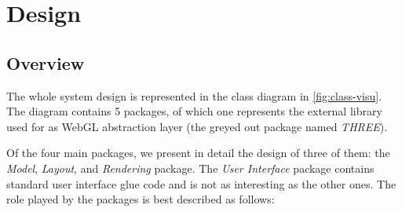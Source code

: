 \section{Design}


\subsection{Overview}

The whole system design is represented in the class diagram in \vref{fig:class-visu}. The diagram contains 5 packages, of which one represents the external library used for as WebGL abstraction layer (the greyed out package named \emph{THREE}).

Of the four main packages, we present in detail the design of three of them: the \emph{Model}, \emph{Layout}, and \emph{Rendering} package. The \emph{User Interface} package contains standard user interface glue code and is not as interesting as the other ones. The role played by the packages is best described as follows:

